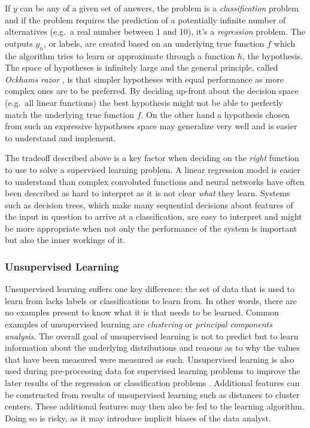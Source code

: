 If $y$ can be any of a given set of answers, the problem is a \emph{classification} problem and if the problem requires the
prediction of a potentially infinite number of alternatives (e.g.\ a real number between 1 and 10), it's a
\emph{regression} problem. The outputs $y_n$, or labels, are created based on an underlying true function $f$ which the
algorithm tries to learn or approximate through a function $h$, the hypothesis. The space of hypotheses is infinitely
large and the general principle, called \emph{Ockhams razor} , is that simpler hypotheses with equal performance as more complex
ones are to be preferred. By deciding up-front about the decision space (e.g.\ all linear functions) the best hypothesis
might not be able to perfectly match the underlying true function $f$. On the other hand a hypothesis chosen from such
an expressive hypotheses space may generalize very well and is easier to understand and implement.

The tradeoff described above is a key factor when deciding on the \emph{right} function to use to solve a supervised
learning problem. A linear regression model is easier to understand than complex convoluted functions and neural
networks have
often been described as hard to interpret as it is not clear \emph{what} they learn. Systems such as decision trees,
which make many sequential decisions about features of the input in question to arrive at a classification, are easy to
interpret and might be more appropriate when not only the performance of the system is important but also the
inner workings of it.


\subsubsection{Unsupervised Learning}
Unsupervised learning suffers one key difference: the set of data that is used to learn from lacks labels or
classifications to learn from. In other words, there are no examples present to know what it is that needs to be
learned. Common examples of unsupervised learning are \emph{clustering} or \emph{principal components analysis}. The
overall goal of unsupervised learning is not to predict but to learn information about the underlying distributions and
reasons as to why the values that have been measured were measured as such. Unsupervised learning is also used during pre-processing
data for supervised learning problems to improve the later results of the regression or classification problems
\cite[p.373f.]{james2013introduction}.
Additional features can be constructed from results of unsupervised learning such as distances to cluster centers. These
additional features may then also be fed to the learning algorithm. Doing so is risky, as it may introduce
implicit biases of the data analyst.

